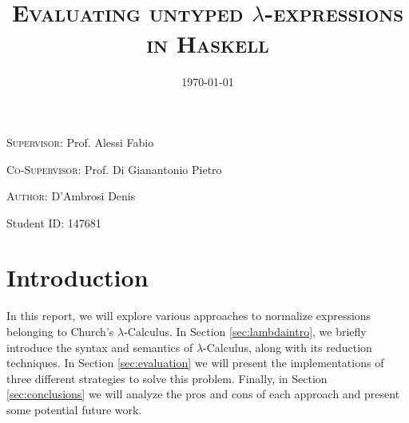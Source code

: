\documentclass{article}
\title{\textsc{Evaluating untyped $\lambda$-expressions in Haskell}}
\date{\today}
\begin{document}
\maketitle

\begin{center}
\noindent\begin{minipage}{0.68\textwidth}
    \textsc{Supervisor:} Prof. Alessi Fabio

    \textsc{Co-Supervisor:} Prof. Di Gianantonio Pietro
  \end{minipage}%
  \begin{minipage}{0.5\textwidth}
    \textsc{Author:} D'Ambrosi Denis

    Student ID: 147681
  \end{minipage}

  \vspace{0.5cm}

\end{center}

\vspace{0.5cm}

\tableofcontents

\newpage

\section*{Introduction}

In this report, we will explore various approaches to normalize expressions belonging to Church's $\lambda$-Calculus. In Section \ref{sec:lambdaintro}, we briefly introduce the syntax and semantics of $\lambda$-Calculus, along with its reduction techniques. In Section \ref{sec:evaluation} we will present the implementations of three different strategies to solve this problem. Finally, in Section \ref{sec:conclusions} we will analyze the pros and cons of each approach and present some potential future work.
\end{document}
